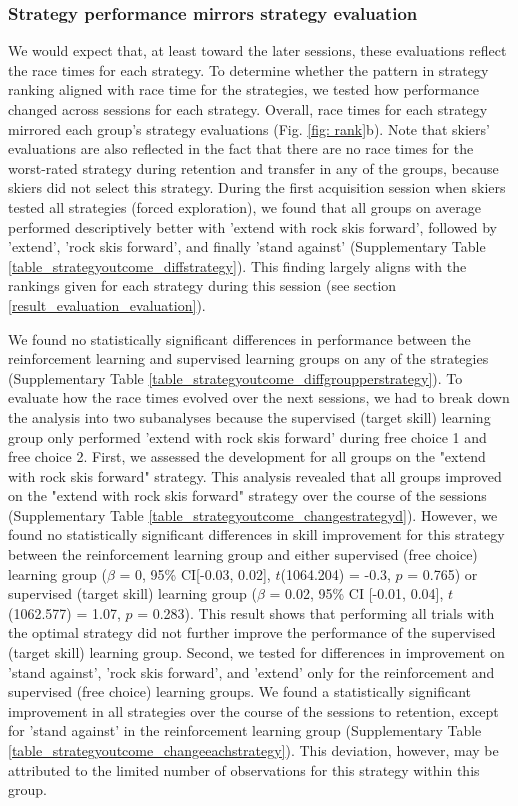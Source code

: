 \documentclass[pdflatex,sn-nature]{sn-jnl}%
\theoremstyle{thmstyleone}%
\theoremstyle{thmstyletwo}%
\theoremstyle{thmstylethree}%
\begin{document}
\subsubsection{Strategy performance mirrors strategy evaluation}\label{result_evaluation_outcomes}
We would expect that, at least toward the later sessions, these evaluations reflect the race times for each strategy. To determine whether the pattern in strategy ranking aligned with race time for the strategies, we tested how performance changed across sessions for each strategy. Overall, race times for each strategy mirrored each group's strategy evaluations (Fig. \ref{fig: rank}b). Note that skiers' evaluations are also reflected in the fact that there are no race times for the worst-rated strategy during retention and transfer in any of the groups, because skiers did not select this strategy. During the first acquisition session when skiers tested all strategies (forced exploration), we found that all groups on average performed descriptively better with 'extend with rock skis forward', followed by 'extend', 'rock skis forward', and finally 'stand against' (Supplementary Table \ref{table_strategyoutcome_diffstrategy}). This finding largely aligns with the rankings given for each strategy during this session (see section \ref{result_evaluation_evaluation}). 

We found no statistically significant differences in performance between the reinforcement learning and supervised learning groups on any of the strategies (Supplementary Table \ref{table_strategyoutcome_diffgroupperstrategy}). To evaluate how the race times evolved over the next sessions, we had to break down the analysis into two subanalyses because the supervised (target skill) learning group only performed 'extend with rock skis forward' during free choice 1 and free choice 2. First, we assessed the development for all groups on the "extend with rock skis forward" strategy. This analysis revealed that all groups improved on the "extend with rock skis forward" strategy  over the course of the sessions (Supplementary Table \ref{table_strategyoutcome_changestrategyd}). However, we found no statistically significant differences in skill improvement for this strategy between the reinforcement learning group and either supervised (free choice) learning group ($\beta$ = 0, 95\% CI[-0.03, 0.02], $t$(1064.204) = -0.3, $p$ = 0.765) or supervised (target skill) learning group ($\beta$ = 0.02, 95\% CI [-0.01, 0.04], $t$(1062.577) = 1.07, $p$ = 0.283). This result shows that performing all trials with the optimal strategy did not further improve the performance of the supervised (target skill) learning group. Second, we tested for differences in improvement on 'stand against', 'rock skis forward', and 'extend' only for the reinforcement and supervised (free choice) learning groups. We found a statistically significant improvement in all strategies over the course of the sessions to retention, except for 'stand against' in the reinforcement learning group (Supplementary Table \ref{table_strategyoutcome_changeeachstrategy}). This deviation, however, may be attributed to the limited number of observations for this strategy within this group. 
\end{document}
